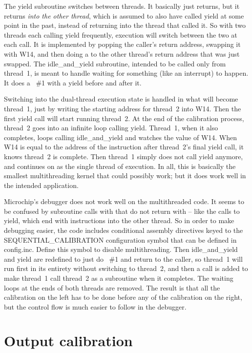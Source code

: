 The yield subroutine switches between threads.  It basically just returns,
but it returns \emph{into the other thread}, which is assumed to also have
called yield at some point in the past, instead of returning into the thread
that called it.  So with two threads each calling yield frequently,
execution will switch between the two at each call.  It is implemented by
popping the caller's return address, swapping it with W14, and then doing a
 to the other thread's return address that was just swapped.  The
idle\_and\_yield subroutine, intended to be called only from thread~1, is
meant to handle waiting for something (like an interrupt) to happen.  It
does a ~\#1 with a yield before and after it.

Switching into the dual-thread execution state is handled in what will
become thread~1, just by writing the starting address for thread~2 into W14. 
Then the first yield call will start running thread~2.  At the end of the
calibration process, thread~2 goes into an infinite loop calling yield. 
Thread~1, when it also completes, loops calling idle\_and\_yield and watches the
value of W14.  When W14 is equal to the address of the instruction after
thread~2's final yield call, it knows thread~2 is complete.  Then thread~1
simply does not call yield anymore, and continues on as the single thread of
execution.  In all, this is basically the smallest multithreading kernel
that could possibly work; but it does work well in the intended application.

Microchip's debugger does not work well on the multithreaded code.  It seems
to be confused by subroutine calls with  that do not return with
 -- like the calls to yield, which end with 
instructions into the other thread.  So in order to make debugging easier,
the code includes conditional assembly directives keyed to the
SEQUENTIAL\_CALIBRATION configuration symbol that can be defined in
config.inc.  Define this symbol to disable multithreading.  Then
idle\_and\_yield and yield are redefined to just do ~\#1 and
return to the caller, so thread~1 will run first in its entirety without
switching to thread~2, and then a call is added to make thread~1 call
thread~2 as a subroutine when it completes.  The waiting loops at the ends
of both threads are removed.  The result is that all the calibration on the
left has to be done before any of the calibration on the right, but the
control flow is much easier to follow in the debugger.

\section{Output calibration}

